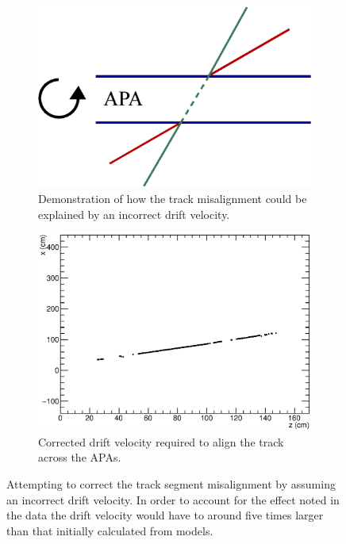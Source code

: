 \begin{figure}
  \centering
  \begin{subfigure}[t]{0.48\linewidth}
    \centering
    \includegraphics[width=\textwidth]{misalign_track_drift_geo.eps}
    \caption{Demonstration of how the track misalignment could be explained by an incorrect drift velocity.}
    \label{fig:TrackMisalignmentDriftVelocityGeo}
  \end{subfigure}
  \hfill
  \begin{subfigure}[t]{0.48\linewidth}
    \centering
    \includegraphics[width=\textwidth]{misalign_track_drift_res.eps}
    \caption{Corrected drift velocity required to align the track across the APAs.}
    \label{fig:TrackMisalignmentDriftVelocityRes}
  \end{subfigure}
  \caption[Attempting to correct the track segment misalignment by assuming an incorrect drift velocity.]{Attempting to correct the track segment misalignment by assuming an incorrect drift velocity.  In order to account for the effect noted in the data the drift velocity would have to around five times larger than that initially calculated from models.}
  \label{fig:TrackMisalignmentDriftVelocity}
\end{figure}

